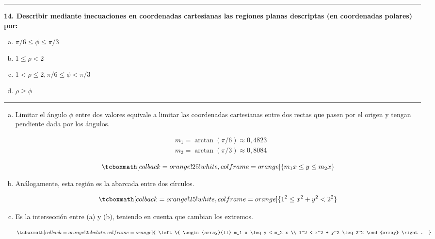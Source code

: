 \documentclass{article}
\begin{document}
\hrule
\vspace{10 pt}
\textbf{14. Describir mediante inecuaciones en coordenadas cartesianas las regiones planas descriptas (en coordenadas polares) por:}

\begin{enumerate}[(a)]
\bfseries
\item $\pi/6 \leq \phi \leq \pi/3$

\item $1 \leq \rho < 2$

\item $1 < \rho \leq 2, \pi/6 \leq \phi < \pi/3$

\item $\rho \geq \phi$
\end{enumerate}
\hrule

\begin{enumerate}[(a)]
\item Limitar el ángulo $\phi$ entre dos valores equivale a limitar las coordenadas cartesianas entre dos rectas que pasen por el origen y tengan pendiente dada por los ángulos.

\begin{subequations}
\begin{align}
& m_1 = \arctan(\pi/6) \approx 0,4823 \\
& m_2 = \arctan(\pi/3) \approx 0,8084
\end{align}
\end{subequations}

\begin{equation}
\tcboxmath[colback=orange!25!white,colframe=orange]
{ m_1 x \leq y \leq m_2 x }
\end{equation}

\item Análogamente, esta región es la abarcada entre dos círculos.

\begin{equation}
\tcboxmath[colback=orange!25!white,colframe=orange]
{ 1^2 \leq x^2 + y^2 < 2^2 }
\end{equation}

\item Es la intersección entre (a) y (b), teniendo en cuenta que cambian los extremos.

\begin{equation}
\tcboxmath[colback=orange!25!white,colframe=orange]
{ \left\{ \begin{array}{ll}
m_1 x \leq y < m_2 x \\
1^2 < x^2 + y^2 \leq 2^2
\end{array} \right. }
\end{equation}


\end{enumerate}
\end{document}
